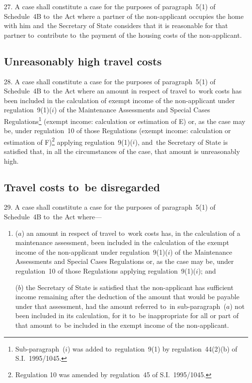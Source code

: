 \documentclass[12pt,a4paper]{article}
\begin{document}
27. A case shall constitute a case for
the purposes of paragraph~5(1) of Schedule~4B to~the Act where a partner of the
non-applicant occupies the home with him and~the Secretary of State considers
that it is reasonable for that partner to~contribute to~the payment of the
housing costs of the non-applicant.

\subsection[28. Unreasonably high travel costs]{Unreasonably high travel costs}

28. A case shall constitute a case for the
purposes of paragraph~5(1) of Schedule~4B to~the Act where an amount in respect
of travel to~work costs has been included in the calculation of exempt income of
the non-applicant under regulation~9(1)($i$) of the Maintenance Assessments and
Special Cases Regulations\footnote{\frenchspacing Sub-paragraph~($i$) was added to~regulation~9(1) by regulation~44(2)(b) of S.I.~1995/1045.} (exempt income: calculation or estimation of E)
or, as the case may be, under regulation~10 of those Regulations (exempt income:
calculation or estimation of F)\footnote{\frenchspacing Regulation 10 was amended by regulation~45 of S.I.~1995/1045.} applying regulation~9(1)($i$), and~the
Secretary of State is satisfied that, in all the circumstances of the case, that
amount is unreasonably high.

\subsection[29. Travel costs to~be disregarded]{Travel costs to~be disregarded}

29. A case shall constitute a case for the
purposes of paragraph~5(1) of Schedule~4B to~the Act where—
\begin{enumerate}\item[]
($a$) an amount in respect of travel to~work costs has, in the calculation of a
maintenance assessment, been included in the calculation of the exempt income of
the non-applicant under regulation~9(1)($i$) of the Maintenance Assessments and
Special Cases Regulations or, as the case may be, under regulation~10 of those
Regulations applying regulation~9(1)($i$); and

($b$) the Secretary of State is satisfied that the non-applicant has sufficient
income remaining after the deduction of the amount that would be payable under
that assessment, had the amount referred to~in sub-paragraph~($a$) not been
included in its calculation, for it to~be inappropriate for all or part of that
amount to~be included in the exempt income of the non-applicant.
\end{enumerate}
\end{document}
